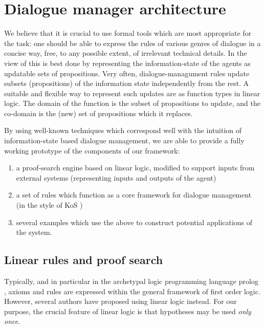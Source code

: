\documentclass[11pt]{article}
\date{\today}
\title{}
\begin{document}
\section{Dialogue manager architecture}
\label{sec:orge902f13}
\label{sec:dm}

We believe that it is crucial to use formal tools which are most
appropriate for the task: one should be able to express the rules of
various genres of dialogue in a concise way, free, to any possible
extent, of irrelevant technical details.  In the view of
\citet{dixon2009plans} this is best done by representing the
information-state of the agents as updatable sets of
propositions. Very often, dialogue-managument rules update subsets
(propositions) of the information state independently from the rest. A
suitable and flexible way to represent such updates are as function
types in linear logic. The domain of the function is the subset of
propositions to update, and the co-domain is the (new) set of
propositions which it replaces.

By using well-known techniques which correspond well with the
intuition of information-state based dialogue management, we are able
to provide a fully working prototype of the components of our
framework:

\begin{enumerate}
\item a proof-search engine based on linear logic, modified to support
inputs from external systems (representing inputs and outputs of
the agent)

\item a set of rules which function as a core framework for dialogue
management (in the style of KoS \citep{ginzburg2012interactive})

\item several examples which use the above to construct potential
applications of the system.
\end{enumerate}
\subsection{Linear rules and proof search}
\label{sec:org5492034}
Typically, and in particular in the archetypal logic programming
language prolog \citep{bratko2001prolog}, axioms and rules are expressed
within the general framework of first order logic. However, several
authors \citep{dixon2009plans,martens2015programming} have proposed
using linear logic \citep{girard1995linear} instead. For our purpose,
the crucial feature of linear logic is that hypotheses may be used
\emph{only once}.
\end{document}
